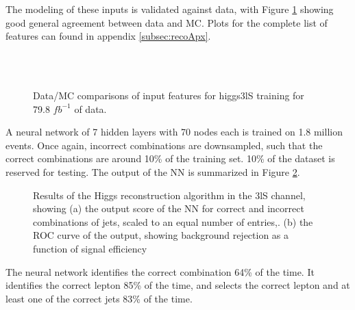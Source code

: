 The modeling of these inputs is validated against data, with Figure \ref{fig:model_higgs3lS} showing good general agreement between data and MC. Plots for the complete list of features can found in appendix \ref{subsec:recoApx}.

\begin{figure}[H]
    \centering
    \\
    \\
    \caption{Data/MC comparisons of input features for higgs3lS training for 79.8 $fb^{-1}$ of data.}
    \label{fig:model_higgs3lS}
\end{figure} 

A neural network of 7 hidden layers with 70 nodes each is trained on 1.8 million events. Once again, incorrect combinations are downsampled, such that the correct combinations are around 10\% of the training set. 10\% of the dataset is reserved for testing. The output of the NN is summarized in Figure \ref{fig:higgs3lSresults}.

\begin{figure}[H]
    \centering
  \label{fig:higgs3lSresults}
  \caption{Results of the Higgs reconstruction algorithm in the 3lS channel, showing (a) the output score of the NN for correct and incorrect combinations of jets, scaled to an equal number of entries,. (b) the ROC curve of the output, showing background rejection as a function of signal efficiency}
\end{figure} 

The neural network identifies the correct combination 64\% of the time. It identifies the correct lepton 85\% of the time, and selects the correct lepton and at least one of the correct jets 83\% of the time.


